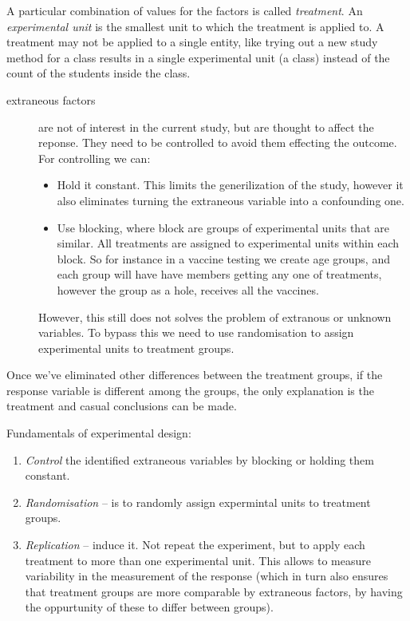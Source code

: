 A particular combination of values for the factors is called \emph{treatment}.
An \emph{experimental unit} is the smallest unit to which the treatment is
applied to. A treatment may not be applied to a single entity, like trying out a
new study method for a class results in a single experimental unit (a class)
instead of the count of the students inside the class.

\begin{description}
  \item[extraneous factors] are not of interest in the current study, but are
  thought to affect the reponse. They need to be controlled to avoid them
  effecting the outcome. For controlling we can: 
  \begin{itemize}
  \item Hold it constant. This limits the generilization of the study, however
  it also eliminates turning the extraneous variable into a confounding one.
  \item Use blocking, where block are groups of experimental units that are
  similar. All treatments are assigned to experimental units within each block.
  So for instance in a vaccine testing we create age groups, and each group will
  have have members getting any one of treatments, however the group as a hole,
  receives all the vaccines.
\end{itemize}
  However, this still does not solves the problem of extranous or unknown
  variables. To bypass this we need to use randomisation to assign experimental
  units to treatment groups.
\end{description}

Once we've eliminated other differences between the treatment groups, if the
response variable is different among the groups, the only explanation is the
treatment and casual conclusions can be made.

Fundamentals of experimental design:

\begin{enumerate}
  \item \emph{Control} the identified extraneous variables by blocking or
  holding them constant.
  \item \emph{Randomisation} -- is to randomly assign expermintal units
  to treatment groups.
  \item \emph{Replication} -- induce it. Not repeat the experiment, but to apply
  each treatment to more than one experimental unit. This allows to measure
  variability in the measurement of the response (which in turn also ensures
  that treatment groups are more comparable by extraneous factors, by having
  the oppurtunity of these to differ between groups).
\end{enumerate}

